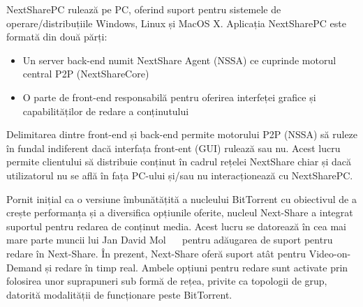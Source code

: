 NextSharePC rulează pe PC, oferind suport pentru sistemele de
operare/distribuțiile Windows, Linux și MacOS X. Aplicația NextSharePC este
formată din două părți:
\begin{itemize}
  \item Un server back-end numit NextShare Agent (NSSA) ce cuprinde motorul
  central P2P (NextShareCore)
  \item O parte de front-end responsabilă pentru oferirea interfeței grafice
  și capabilităților de redare a conținutului
\end{itemize}

Delimitarea dintre front-end și back-end permite motorului P2P (NSSA) să
ruleze în fundal indiferent dacă interfața front-ent (GUI) rulează sau nu. 
Acest lucru permite clientului să distribuie conținut în cadrul rețelei
NextShare chiar și dacă utilizatorul nu se află în fața PC-ului și/sau nu
interacționează cu NextSharePC.

Pornit inițial ca o versiune îmbunătățită a nucleului BitTorrent cu obiectivul
de a crește performanța și a diversifica opțiunile oferite, nucleul Next-Share
a integrat suportul pentru redarea de conținut media. Acest lucru se datorează
în cea mai mare parte muncii lui Jan David Mol
~\cite{give-to-get}~\cite{design-p2p-live} pentru adăugarea de suport pentru
redare în Next-Share. În prezent, Next-Share oferă suport atât pentru
Video-on-Demand și redare în timp real. Ambele opțiuni pentru redare sunt
activate prin folosirea unor suprapuneri sub formă de rețea, privite ca
topologii de grup, datorită modalității de funcționare peste BitTorrent.

